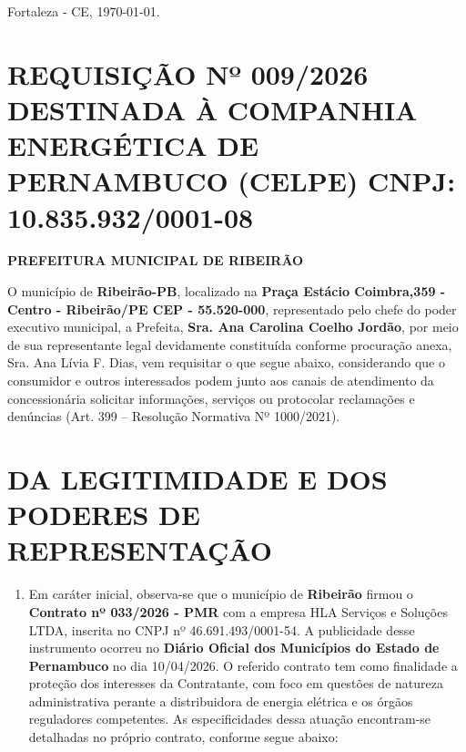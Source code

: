 \documentclass[11pt,a4paper]{article}
\begin{document}
\begin{flushright}
Fortaleza - CE, \today.
\end{flushright}

\section{REQUISIÇÃO Nº 009/2026 DESTINADA À COMPANHIA ENERGÉTICA DE PERNAMBUCO (CELPE) CNPJ: 10.835.932/0001-08}
\vspace{-0.4cm}
\textbf{PREFEITURA MUNICIPAL DE RIBEIRÃO}

\vspace{0.5cm}

O município de \textbf{Ribeirão-PB}, localizado na \textbf{Praça Estácio Coimbra,359 - Centro - Ribeirão/PE CEP - 55.520-000}, representado pelo chefe do poder executivo municipal, a Prefeita, \textbf{Sra. Ana Carolina Coelho Jordão}, por meio de sua representante legal devidamente constituída conforme procuração anexa, Sra. Ana Lívia F. Dias, vem requisitar o que segue abaixo, considerando que o consumidor e outros interessados podem junto aos canais de atendimento da concessionária solicitar informações, serviços ou protocolar reclamações e denúncias (Art. 399 -- Resolução Normativa Nº 1000/2021).

\section{DA LEGITIMIDADE E DOS PODERES DE REPRESENTAÇÃO}

\begin{enumerate}
\item
  Em caráter inicial, observa-se que o município de \textbf{Ribeirão} firmou o \textbf{Contrato nº 033/2026 - PMR} com a empresa HLA Serviços e Soluções LTDA, inscrita no CNPJ nº 46.691.493/0001-54. A publicidade desse instrumento ocorreu no \textbf{Diário Oficial dos Municípios do Estado de Pernambuco} no dia 10/04/2026. O referido contrato tem como finalidade a proteção dos interesses da Contratante, com foco em questões de natureza administrativa perante a distribuidora de energia elétrica e os órgãos reguladores competentes. As especificidades dessa atuação encontram-se detalhadas no próprio contrato, conforme segue abaixo:
\end{enumerate}
\end{document}
